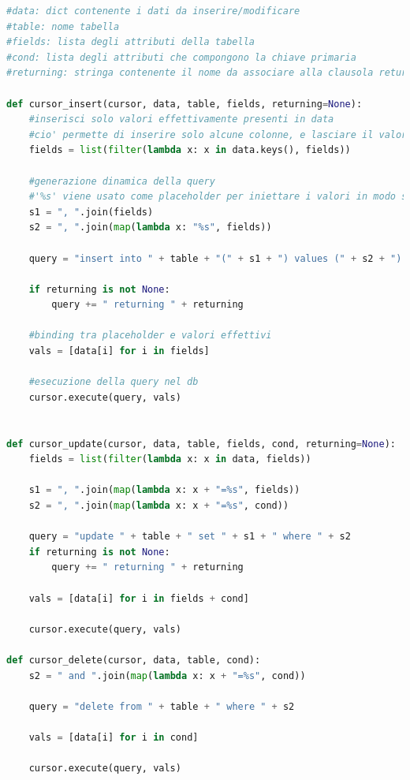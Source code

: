 \documentclass[11pt,a4paper,english]{article}
\begin{document}
\begin{lstlisting}[language=python, caption=Funzioni \emph{cursor\_*}]
#data: dict contenente i dati da inserire/modificare
#table: nome tabella
#fields: lista degli attributi della tabella
#cond: lista degli attributi che compongono la chiave primaria
#returning: stringa contenente il nome da associare alla clausola returning (per la generazione di valori da parte del database)

def cursor_insert(cursor, data, table, fields, returning=None):
    #inserisci solo valori effettivamente presenti in data
    #cio' permette di inserire solo alcune colonne, e lasciare il valore di default nelle rimanenti
    fields = list(filter(lambda x: x in data.keys(), fields))

    #generazione dinamica della query
    #'%s' viene usato come placeholder per iniettare i valori in modo safe (contro attacchi di tipo sql injection)
    s1 = ", ".join(fields)
    s2 = ", ".join(map(lambda x: "%s", fields))

    query = "insert into " + table + "(" + s1 + ") values (" + s2 + ") "

    if returning is not None:
        query += " returning " + returning

    #binding tra placeholder e valori effettivi
    vals = [data[i] for i in fields]

    #esecuzione della query nel db
    cursor.execute(query, vals)


def cursor_update(cursor, data, table, fields, cond, returning=None):
    fields = list(filter(lambda x: x in data, fields))

    s1 = ", ".join(map(lambda x: x + "=%s", fields))
    s2 = ", ".join(map(lambda x: x + "=%s", cond))

    query = "update " + table + " set " + s1 + " where " + s2
    if returning is not None:
        query += " returning " + returning

    vals = [data[i] for i in fields + cond]

    cursor.execute(query, vals)

def cursor_delete(cursor, data, table, cond):
    s2 = " and ".join(map(lambda x: x + "=%s", cond))

    query = "delete from " + table + " where " + s2

    vals = [data[i] for i in cond]

    cursor.execute(query, vals)
\end{lstlisting}
\end{document}
